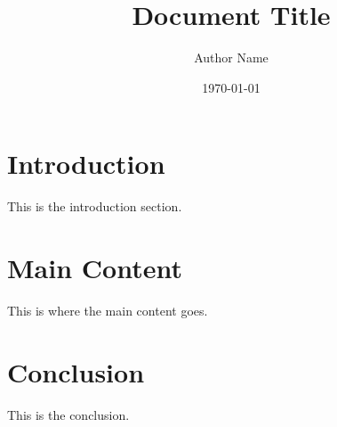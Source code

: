 \documentclass[12pt]{article}
\title{Document Title}
\author{Author Name}
\date{\today}
\begin{document}
\maketitle

\tableofcontents
\newpage

\section{Introduction}
This is the introduction section.

\section{Main Content}
This is where the main content goes.

\section{Conclusion}
This is the conclusion.
\end{document}
